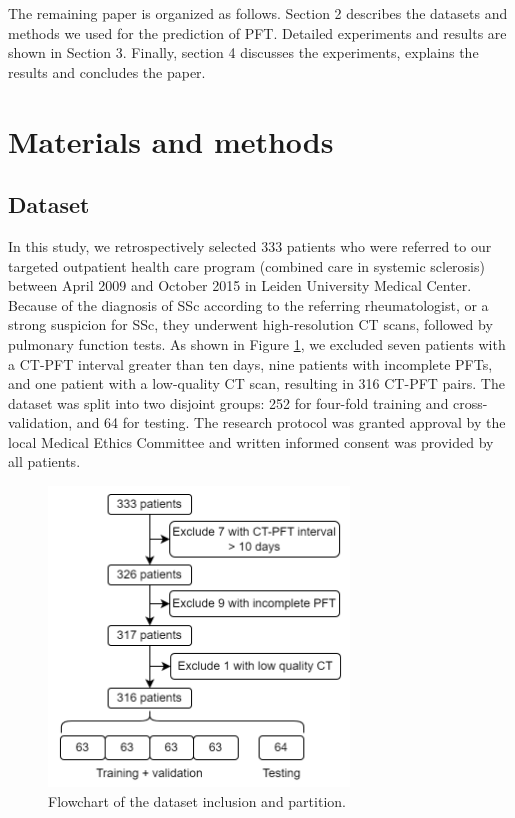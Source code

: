 The remaining paper is organized as follows. Section 2 describes the datasets and methods we used for the prediction of PFT. Detailed experiments and results are shown in Section 3. Finally, section 4 discusses the experiments, explains the results and concludes the paper.


\section{Materials and methods}
\subsection{Dataset}
In this study, we retrospectively selected 333 patients who were referred to our targeted outpatient health care program (combined care in systemic sclerosis) between April 2009 and October 2015 in Leiden University Medical Center. Because of the diagnosis of SSc according to the referring rheumatologist, or a strong suspicion for SSc, they underwent high-resolution CT scans, followed by pulmonary function tests. As shown in Figure \ref{fig:chap4_flowchart}, we excluded seven patients with a CT-PFT interval greater than ten days, nine patients with incomplete PFTs, and one patient with a low-quality CT scan, resulting in 316 CT-PFT pairs. The dataset was split into two disjoint groups: 252 for four-fold training and cross-validation, and 64 for testing. The research protocol was granted approval by the local Medical Ethics Committee and written informed consent was provided by all patients.


\begin{figure}[tb]
    \centering
    \includegraphics[width=8cm]{flowchart.png}
    \caption{Flowchart of the dataset inclusion and partition.}
    \label{fig:chap4_flowchart}
\end{figure}

